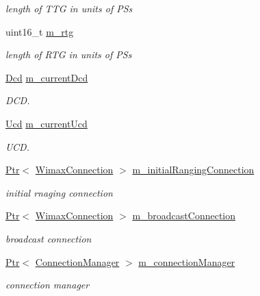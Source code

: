 \begin{DoxyCompactItemize}
\begin{DoxyCompactList}\small\item\em length of T\+TG in units of P\+Ss \end{DoxyCompactList}\item 
uint16\+\_\+t \hyperlink{classns3_1_1WimaxNetDevice_af5cff1eacbdbfa335bacbebe2191a552}{m\+\_\+rtg}
\begin{DoxyCompactList}\small\item\em length of R\+TG in units of P\+Ss \end{DoxyCompactList}\item 
\hyperlink{classns3_1_1Dcd}{Dcd} \hyperlink{classns3_1_1WimaxNetDevice_aa88c79e9279fa4a37ee1caea7d3096df}{m\+\_\+current\+Dcd}
\begin{DoxyCompactList}\small\item\em D\+CD. \end{DoxyCompactList}\item 
\hyperlink{classns3_1_1Ucd}{Ucd} \hyperlink{classns3_1_1WimaxNetDevice_a0f63e53ca768ad55e7976a35dd0b3de0}{m\+\_\+current\+Ucd}
\begin{DoxyCompactList}\small\item\em U\+CD. \end{DoxyCompactList}\item 
\hyperlink{classns3_1_1Ptr}{Ptr}$<$ \hyperlink{classns3_1_1WimaxConnection}{Wimax\+Connection} $>$ \hyperlink{classns3_1_1WimaxNetDevice_a2bcfecf3dcc39a5953561c544358e84d}{m\+\_\+initial\+Ranging\+Connection}
\begin{DoxyCompactList}\small\item\em initial rnaging connection \end{DoxyCompactList}\item 
\hyperlink{classns3_1_1Ptr}{Ptr}$<$ \hyperlink{classns3_1_1WimaxConnection}{Wimax\+Connection} $>$ \hyperlink{classns3_1_1WimaxNetDevice_a601399b26a925d59e4161cf73bb354b0}{m\+\_\+broadcast\+Connection}
\begin{DoxyCompactList}\small\item\em broadcast connection \end{DoxyCompactList}\item 
\hyperlink{classns3_1_1Ptr}{Ptr}$<$ \hyperlink{classns3_1_1ConnectionManager}{Connection\+Manager} $>$ \hyperlink{classns3_1_1WimaxNetDevice_a7b49b2dfb4fcf9f10879d306ee5d8d69}{m\+\_\+connection\+Manager}
\begin{DoxyCompactList}\small\item\em connection manager \end{DoxyCompactList}\item 

\end{DoxyCompactItemize}
